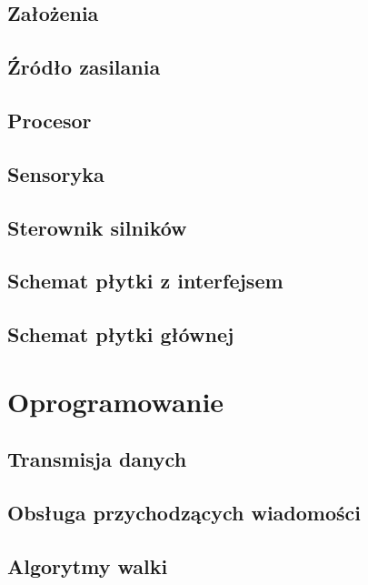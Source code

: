 \subsection{Założenia}
\subsection{Źródło zasilania}
\subsection{Procesor}
\subsection{Sensoryka}
\subsection{Sterownik silników}
\subsection{Schemat płytki z interfejsem}
\subsection{Schemat płytki głównej}

\section{Oprogramowanie}
\subsection{Transmisja danych}
\subsection{Obsługa przychodzących wiadomości}
\subsection{Algorytmy walki}
